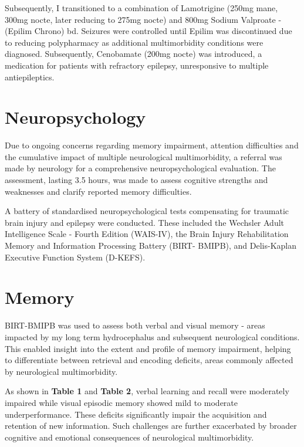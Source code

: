 \documentclass{article}
\begin{document}
Subsequently, I transitioned to a combination of Lamotrigine (250mg mane, 300mg nocte, later reducing to 275mg nocte) and 800mg Sodium Valproate - (Epilim Chrono) bd. Seizures were controlled until Epilim was discontinued due to reducing polypharmacy as additional multimorbidity conditions were diagnosed. Subsequently, Cenobamate (200mg nocte) was introduced, a medication for patients with refractory epilepsy, unresponsive to multiple antiepileptics.\cite{french2020}

\section*{Neuropsychology}
Due to ongoing concerns regarding memory impairment, attention difficulties and the cumulative impact of multiple neurological multimorbidity, a referral was made by neurology for a comprehensive neuropsychological evaluation. The assessment, lasting 3.5 hours, was made to assess cognitive strengths and weaknesses and clarify reported memory difficulties.

A battery of standardised neuropsychological tests compensating for traumatic brain injury and epilepsy were conducted. These included the Wechsler Adult Intelligence Scale - Fourth Edition (WAIS-IV), the Brain Injury Rehabilitation Memory and Information Processing Battery (BIRT- BMIPB), and Delis-Kaplan Executive Function System (D-KEFS).

\section*{Memory}
BIRT-BMIPB was used to assess both verbal and visual memory - areas impacted by my long term hydrocephalus and subsequent neurological conditions. This enabled insight into the extent and profile of memory impairment, helping to differentiate between retrieval and encoding deficits, areas commonly affected by neurological multimorbidity.



As shown in \textbf{Table 1} and \textbf{Table 2}, verbal learning and recall were moderately impaired while visual episodic memory showed mild to moderate underperformance. These deficits significantly impair the acquisition and retention of new information. Such challenges are further exacerbated by broader cognitive and emotional consequences of neurological multimorbidity.
\end{document}
